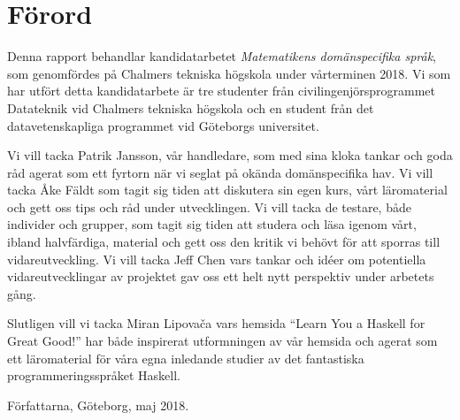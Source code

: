 \thispagestyle{plain}			%
\section*{Förord}

Denna rapport behandlar kandidatarbetet \textit{Matematikens domänspecifika språk},
som genomfördes på Chalmers tekniska högskola under vårterminen 2018. Vi som har
utfört detta kandidatarbete är tre studenter från civilingenjörsprogrammet
Datateknik vid Chalmers tekniska högskola och en student från det
datavetenskapliga programmet vid Göteborgs universitet.

Vi vill tacka Patrik Jansson, vår handledare, som med sina kloka tankar och goda
råd agerat som ett fyrtorn när vi seglat på okända domänspecifika hav. Vi vill
tacka Åke Fäldt som tagit sig tiden att diskutera sin egen kurs, vårt
läromaterial och gett oss tips och råd under utvecklingen. Vi vill tacka de
testare, både individer och grupper, som tagit sig tiden att studera och läsa
igenom vårt, ibland halvfärdiga, material och gett oss den kritik vi behövt för
att sporras till vidareutveckling. Vi vill tacka Jeff Chen vars tankar och idéer
om potentiella vidareutvecklingar av projektet gav oss ett helt nytt perspektiv
under arbetets gång.

Slutligen vill vi tacka Miran Lipovača vars hemsida ``Learn You a
Haskell for Great Good!'' har både inspirerat utformningen av vår hemsida och
agerat som ett läromaterial för våra egna inledande studier av det fantastiska
programmeringsspråket Haskell.

\vspace{1.5cm}
\hfill
Författarna, Göteborg, maj 2018.

\newpage				%
\thispagestyle{empty}
\mbox{}
